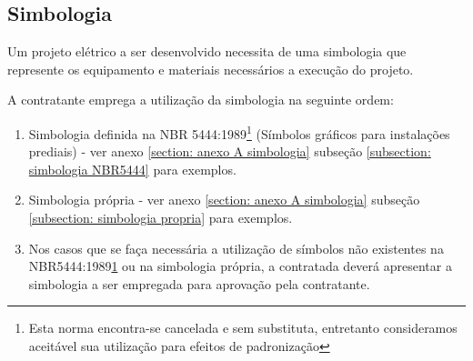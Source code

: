 \subsection{Simbologia}
Um projeto elétrico a ser desenvolvido necessita de uma simbologia que represente os equipamento e materiais necessários a execução do projeto.

A contratante emprega a utilização da simbologia na seguinte ordem:
\begin{enumerate}
	\item Simbologia definida na NBR 5444:1989\footnote{Esta norma encontra-se cancelada e sem substituta, entretanto consideramos aceitável sua utilização para efeitos de padronização\label{fn:5444-89}} (Símbolos gráficos para instalações prediais) - ver anexo \ref{section: anexo A simbologia} subseção \ref{subsection: simbologia NBR5444} para exemplos.
	
	\item Simbologia própria - ver anexo \ref{section: anexo A simbologia} subseção \ref{subsection: simbologia propria} para exemplos.
	
	\item Nos casos que se faça necessária a utilização de símbolos não existentes na NBR5444:1989\ref{fn:5444-89} ou na simbologia própria, a contratada deverá apresentar a simbologia a ser empregada para aprovação pela contratante.
\end{enumerate}